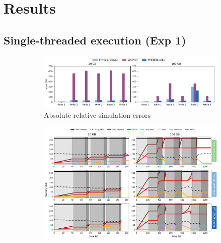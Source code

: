 \section{Results}

\subsection{Single-threaded execution (Exp 1)}

\begin{figure}
    \centering
    \begin{subfigure}{\linewidth}
        \centering
           \includegraphics[width=\linewidth]{result/single/figures/single_errors.pdf}
           \vspace*{-0.7cm}
           \caption{Absolute relative simulation errors}
           \vspace*{0.5cm}
           \label{fig:single_error}
        \end{subfigure}
    \begin{subfigure}{\linewidth}
        \centering
           \includegraphics[width=\linewidth]{result/single/figures/single_memprof.pdf}
           \vspace*{-0.7cm}

\end{subfigure}
\end{figure}
